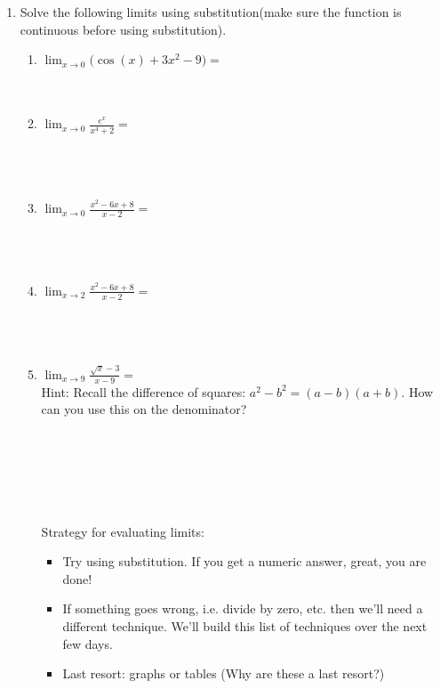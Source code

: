 \documentclass[12pt]{report}
\begin{document}
\begin{enumerate}
\item Solve the following limits using substitution(make sure the function is continuous before using substitution).\\
\begin{enumerate}[label=\alph*.]
    \item $\displaystyle{\lim_{x\to 0} (\cos(x)+3x^2-9}) =$\\\\\\
    \item $\displaystyle{\lim_{x\to 0} \frac{e^x}{x^4+2}} =$\\\\\\\\
    \item $\displaystyle{\lim_{x\to 0} \frac{x^{2}-6x+8}{x-2}}=$\\\\\\\\
    \item $\displaystyle{\lim_{x\to 2} \frac{x^{2}-6x+8}{x-2}}=$\\\\\\\\
    \item $\displaystyle{\lim_{x\to 9} \frac{\sqrt{x}-3}{x-9}=}$\\
    Hint: Recall the difference of squares: $a^2-b^2=(a-b)(a+b)$. How can you use this on the denominator?
    \\\\\\\\\\\\\\

    Strategy for evaluating limits:
\begin{itemize}
\item Try using substitution. If you get a numeric answer, great, you are done!
\item If something goes wrong, i.e. divide by zero, etc. then we'll need a different technique. We'll build this list of techniques over the next few days.
\item Last resort: graphs or tables (Why are these a last resort?)
\end{itemize} 
    

\end{enumerate}
\end{enumerate}
\end{document}
